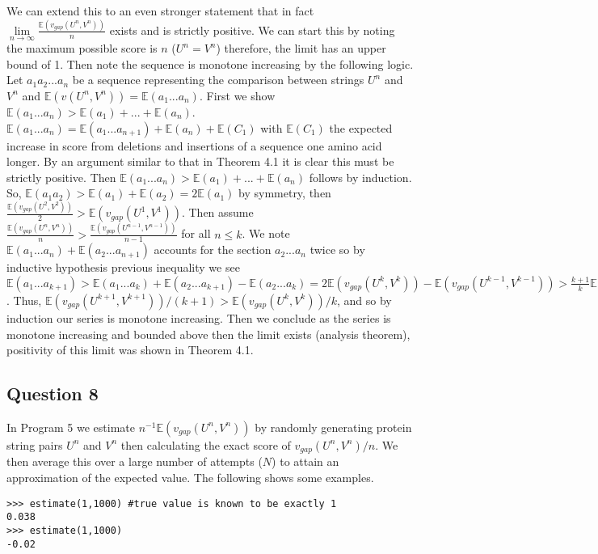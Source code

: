 \documentclass{article}
\begin{document}
We can extend this to an even stronger statement that in fact $\underset{n \to \infty}{\lim} \frac{\mathbb{E}(v_{gap}(U^n,V^n))}{n}$ exists and is strictly positive. We can start this by noting the maximum possible score is $n$ ($U^n=V^n$) therefore, the limit has an upper bound of 1. Then note the sequence is monotone increasing by the following logic. Let $a_1 a_2 ... a_n$ be a sequence representing the comparison between strings $U^n$ and $V^n$ and $\mathbb{E}(v(U^n,V^n))=\mathbb{E}(a_1...a_n)$. First we show $\mathbb{E}(a_1...a_n) > \mathbb{E}(a_1)+...+\mathbb{E}(a_n)$. $\mathbb{E}(a_1...a_n)=\mathbb{E}(a_1...a_{n+1})+\mathbb{E}(a_n) +\mathbb{E}(C_1)$ with $\mathbb{E}(C_1)$ the expected increase in score from deletions and insertions of a sequence one amino acid longer. By an argument similar to that in Theorem 4.1 it is clear this must be strictly positive. Then $\mathbb{E}(a_1...a_n) > \mathbb{E}(a_1)+...+\mathbb{E}(a_n)$ follows by induction. So, $\mathbb{E}(a_1a_2) > \mathbb{E}(a_1)+\mathbb{E}(a_2)=2\mathbb{E}(a_1)$ by symmetry, then $\frac{\mathbb{E}(v_{gap}(U^2,V^2))}{2}>\mathbb{E}(v_{gap}(U^1,V^1))$. Then assume $\frac{\mathbb{E}(v_{gap}(U^n,V^n))}{n}>\frac{\mathbb{E}(v_{gap}(U^{n-1},V^{n-1}))}{n-1}$ for all $n \leq k$. We note $\mathbb{E}(a_1...a_n)+\mathbb{E}(a_2...a_{n+1})$ accounts for the section $a_2...a_n$ twice so by inductive hypothesis previous inequality we see $\mathbb{E}(a_1...a_{k+1})>\mathbb{E}(a_1...a_k)+\mathbb{E}(a_2...a_{k+1})-\mathbb{E} (a_2...a_k) = 2\mathbb{E}(v_{gap}(U^k,V^k)) - \mathbb{E}(v_{gap}(U^{k-1},V^{k-1})) > \frac{k+1}{k} \mathbb{E}(v_{gap}(U^k,V^k))$. Thus, $ \mathbb{E}(v_{gap}(U^{k+1},V^{k+1}))/(k+1) > \mathbb{E}(v_{gap}(U^k,V^k))/k$, and so by induction our series is monotone increasing. Then we conclude as the series is monotone increasing and bounded above then the limit exists (analysis theorem), positivity of this limit was shown in Theorem 4.1.

\subsection{Question 8}
In Program 5 we estimate $n^{-1}\mathbb{E}(v_{gap}(U^n,V^n))$ by randomly generating protein string pairs $U^n$ and $V^n$ then calculating the exact score of $v_{gap}(U^n,V^n)/n$. We then average this over a large number of attempts ($N$) to attain an approximation of the expected value. The following shows some examples.

\begin{lstlisting}
>>> estimate(1,1000) #true value is known to be exactly 1
0.038
>>> estimate(1,1000)
-0.02 
\end{lstlisting}
\end{document}
